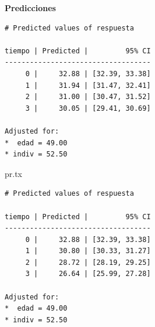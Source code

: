 \documentclass[
]{book}
\newenvironment{Shaded}{\begin{snugshade}}{\end{snugshade}}
\newcommand{\AttributeTok}[1]{\textcolor[rgb]{0.77,0.63,0.00}{#1}}
\newcommand{\DecValTok}[1]{\textcolor[rgb]{0.00,0.00,0.81}{#1}}
\newcommand{\FunctionTok}[1]{\textcolor[rgb]{0.00,0.00,0.00}{#1}}
\newcommand{\NormalTok}[1]{#1}
\newcommand{\OtherTok}[1]{\textcolor[rgb]{0.56,0.35,0.01}{#1}}
\newcommand{\SpecialCharTok}[1]{\textcolor[rgb]{0.00,0.00,0.00}{#1}}
\newcommand{\StringTok}[1]{\textcolor[rgb]{0.31,0.60,0.02}{#1}}
\begin{document}
\textbf{Predicciones}

\begin{Shaded}
\end{Shaded}

\begin{verbatim}
# Predicted values of respuesta

tiempo | Predicted |         95% CI
-----------------------------------
     0 |     32.88 | [32.39, 33.38]
     1 |     31.94 | [31.47, 32.41]
     2 |     31.00 | [30.47, 31.52]
     3 |     30.05 | [29.41, 30.69]

Adjusted for:
*  edad = 49.00
* indiv = 52.50
\end{verbatim}

\begin{Shaded}
\begin{Highlighting}[]
\NormalTok{pr.tx}
\end{Highlighting}
\end{Shaded}

\begin{verbatim}
# Predicted values of respuesta

tiempo | Predicted |         95% CI
-----------------------------------
     0 |     32.88 | [32.39, 33.38]
     1 |     30.80 | [30.33, 31.27]
     2 |     28.72 | [28.19, 29.25]
     3 |     26.64 | [25.99, 27.28]

Adjusted for:
*  edad = 49.00
* indiv = 52.50
\end{verbatim}
\end{document}
